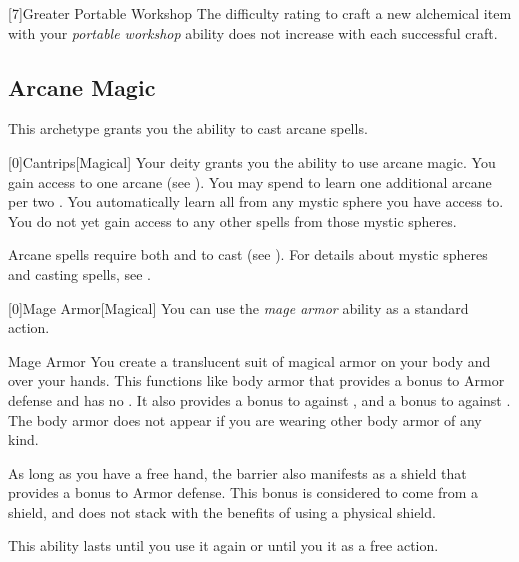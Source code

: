         [7]{Greater Portable Workshop} The difficulty rating to craft a new alchemical item with your \textit{portable workshop} ability does not increase with each successful craft.

    \newpage
    \subsection{Arcane Magic}
        This archetype grants you the ability to cast arcane spells.

        [0]{Cantrips}[Magical]
        Your deity grants you the ability to use arcane magic.
        You gain access to one arcane  (see ).
        You may spend  to learn one additional arcane  per two .
        You automatically learn all  from any mystic sphere you have access to.
        You do not yet gain access to any other spells from those mystic spheres.

        Arcane spells require both  and  to cast (see ).
        For details about mystic spheres and casting spells, see .

        [0]{Mage Armor}[Magical] You can use the \textit{mage armor} ability as a standard action.
        \begin{freeability}{Mage Armor}
            You create a translucent suit of magical armor on your body and over your hands.
            This functions like body armor that provides a  bonus to Armor defense and has no .
            It also provides a  bonus to  against , and a  bonus to  against .
            The body armor does not appear if you are wearing other body armor of any kind.

            As long as you have a free hand, the barrier also manifests as a shield that provides a  bonus to Armor defense.
            This bonus is considered to come from a shield, and does not stack with the benefits of using a physical shield.

            This ability lasts until you use it again or until you  it as a free action.
        \end{freeability}

